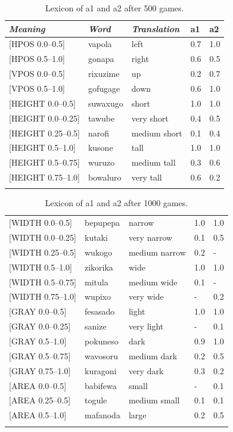 \begin{table}
\begin{center}
\begin{tabular}{ l  l  l  l  l }
\lsptoprule
{\itshape Meaning}&{\itshape Word}&{\itshape Translation} & {\bfshape  a1}&{\bfshape  a2} \\ \midrule
{}[HPOS 0.0–0.5]&vapola&left &0.7&1.0\\ 
{}[HPOS 0.5–1.0]&gonapa&right &0.6&0.5\\ 
{}[VPOS 0.0–0.5]&rixuzime& up & 0.2&0.7\\ 
{}[VPOS 0.5–1.0]&gofugage& down &0.6&1.0\\ 
{}[HEIGHT 0.0–0.5]&suwaxugo&short & 1.0&1.0\\ 
{}[HEIGHT 0.0–0.25]&tawube&very short & 0.4&0.5\\ 
{}[HEIGHT 0.25–0.5]&narofi&medium short&0.1&0.4\\ 
{}[HEIGHT 0.5–1.0]&kusone&tall&1.0&1.0\\ 
{}[HEIGHT 0.5–0.75]&wuruzo&medium tall&0.3&0.6\\ 
{}[HEIGHT 0.75–1.0]&bowaluro&very tall&0.6&0.2\\ 
\lspbottomrule
\end{tabular}
\caption{\label{tab:lex500a}Lexicon of {\bfshape  a1} and {\bfshape  a2} after 500 games.}
\end{center}
\end{table}



\begin{table}
\begin{center}
\begin{tabular}{ l  l  l  l  l }
\lsptoprule
{}[WIDTH 0.0–0.5]&bepupepa&narrow & 1.0&1.0\\ 
{}[WIDTH 0.0–0.25]&kutaki&very narrow & 0.1&0.5\\ 
{}[WIDTH 0.25–0.5]&wukogo&medium narrow & 0.2&-\\ 
{}[WIDTH 0.5–1.0]&zikorika&wide & 1.0&1.0\\ 
{}[WIDTH 0.5–0.75]&mitula&medium wide &0.1&-\\ 
{}[WIDTH 0.75–1.0]&wupixo&very wide & -&0.2\\ 
{}[GRAY 0.0–0.5]&fesasado&light & 1.0&1.0\\ 
{}[GRAY 0.0–0.25]&sanize&very light & -&0.1\\ 
{}[GRAY 0.5–1.0]&pokuneso&dark &0.9&1.0\\ 
{}[GRAY 0.5–0.75]&wavosoru&medium dark & 0.2&0.5\\ 
{}[GRAY 0.75–1.0]&kuragoni&very dark &0.3&0.2\\ 
{}[AREA 0.0–0.5]&babifewa&small & -&0.1\\ 
{}[AREA 0.25–0.5]&togule&medium small & 0.1&0.1\\ 
{}[AREA 0.5–1.0]&mafanoda&large & 0.2&0.5\\ 
\lspbottomrule
\end{tabular}
\caption{\label{tab:lex500b}Lexicon of {\bfshape  a1} and {\bfshape  a2} after 1000 games.}
\end{center}
\end{table}

